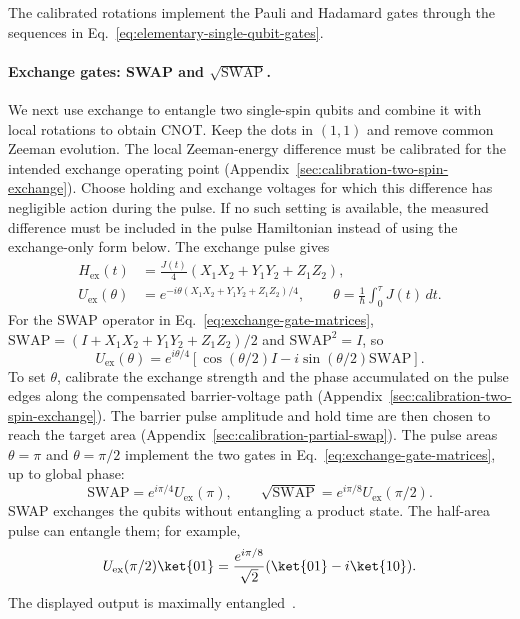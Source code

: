 The calibrated rotations implement the Pauli and Hadamard gates
through the sequences in Eq.~\eqref{eq:elementary-single-qubit-gates}.

\paragraph{Exchange gates: SWAP and \texorpdfstring{$\sqrt{\mathrm{SWAP}}$}{square-root SWAP}.}
\label{sec:exchange-two-qubit-gates}
We next use exchange to entangle two single-spin qubits and combine
it with local rotations to obtain CNOT.
Keep the dots in $(1,1)$ and remove common Zeeman evolution.
The local Zeeman-energy difference must be calibrated for the
intended exchange operating point
(Appendix~\ref{sec:calibration-two-spin-exchange}). Choose holding
and exchange voltages for which this difference has negligible
action during the pulse. If no such setting is available, the
measured difference must be included in the pulse Hamiltonian
instead of using the exchange-only form below.
The exchange pulse gives
\begin{equation}
  \begin{aligned}
  H_{\mathrm{ex}}(t)&=\frac{J(t)}{4}
                  (X_1X_2+Y_1Y_2+Z_1Z_2),\\
  U_{\mathrm{ex}}(\theta)&=
       e^{-i\theta(X_1X_2+Y_1Y_2+Z_1Z_2)/4},
  \qquad \theta=\frac{1}{\hbar}\int_0^\tau J(t)\,dt.
  \end{aligned}
  \label{eq:logical-exchange-gate}
\end{equation}
For the SWAP operator in Eq.~\eqref{eq:exchange-gate-matrices},
$\mathrm{SWAP}=(I+X_1X_2+Y_1Y_2+Z_1Z_2)/2$
and $\mathrm{SWAP}^2=I$,
so
\begin{equation}
  U_{\mathrm{ex}}(\theta)=e^{i\theta/4}
       \left[\cos(\theta/2)I-i\sin(\theta/2)\mathrm{SWAP}\right].
  \label{eq:partial-swap}
\end{equation}
To set $\theta$, calibrate the exchange strength and the phase
accumulated on the pulse edges along the compensated barrier-voltage
path (Appendix~\ref{sec:calibration-two-spin-exchange}). The barrier
pulse amplitude and hold time are then chosen to reach the target
area (Appendix~\ref{sec:calibration-partial-swap}).
The pulse areas $\theta=\pi$ and $\theta=\pi/2$ implement the
two gates in Eq.~\eqref{eq:exchange-gate-matrices}, up to global phase:
\begin{equation}
 \mathrm{SWAP}=e^{i\pi/4}U_{\mathrm{ex}}(\pi),\qquad
 \sqrt{\mathrm{SWAP}}=e^{i\pi/8}U_{\mathrm{ex}}(\pi/2).
 \label{eq:exchange-gate-pulse-areas}
\end{equation}
SWAP exchanges the qubits without entangling a product state.
The half-area pulse can entangle them; for example,
\begin{equation}
  U_{\mathrm{ex}}(\pi/2)\ket{01}
    =\frac{e^{i\pi/8}}{\sqrt{2}}(\ket{01}-i\ket{10}).
  \label{eq:exchange-entanglement}
\end{equation}
The displayed output is maximally entangled~\cite{Loss1998}.

